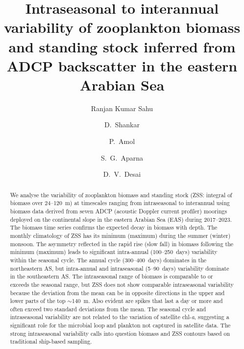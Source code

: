 \documentclass[authoryear,review,11pt]{elsarticle}
\newcommand{\chla}{chl-{\emph{a}}}
\begin{document}
\begin{frontmatter}

\title{Intraseasonal to interannual variability of zooplankton biomass and standing stock inferred from ADCP backscatter in the eastern Arabian Sea}



\author[1,2]{Ranjan Kumar Sahu}

\author[1,2]{D.~Shankar}

\author[2,3]{P.~Amol}
\author[1,2]{S.~G.~Aparna}
\author[1,2]{D.~V.~Desai}


\address[1]{CSIR-National Institute of Oceanography,Dona Paula,403004,Goa,India}

\address[2]{Academy of Scientific and Innovative Research (AcSIR), 
	Ghaziabad,
	201002,
	Uttar~Pradesh,
	India}

\address[3]{CSIR-NIO Regional Centre, Visakhapatnam, 530017, Andhra Pradesh, India}



\begin{abstract}

We analyse the variability of zooplankton biomass and standing stock (ZSS: integral of biomass over 24--120~m) at timescales ranging from intraseasonal to interannual using biomass data derived from seven ADCP (acoustic Doppler current profiler) moorings deployed on the continental slope in the eastern Arabian Sea (EAS) during 2017--2023. The biomass time series confirms the expected decay in biomass with depth. The monthly climatology of ZSS has its minimum (maximum) during the summer (winter) monsoon. The asymmetry reflected in the rapid rise (slow fall) in biomass following the minimum (maximum) leads to significant intra-annual (100--250~days) variability within the seasonal cycle. The annual cycle (300--400~days) dominates in the northeastern AS, but intra-annual and intraseasonal (5--90~days) variability dominate in the southeastern AS. The intraseasonal range of biomass is comparable to or exceeds the seasonal range, but ZSS does not show comparable intraseasonal variability because the deviation from the mean can be in opposite directions in the upper and lower parts of the top $\sim$140~m. Also evident are spikes that last a day or more and often exceed two standard deviations from the mean. The seasonal cycle and intraseasonal variability are not related to the variation of satellite \chla, suggesting a significant role for the microbial loop and plankton not captured in satellite data. The strong intraseasonal variability calls into question biomass and ZSS contours based on traditional ship-based sampling.


\end{abstract}
\end{frontmatter}
\end{document}
